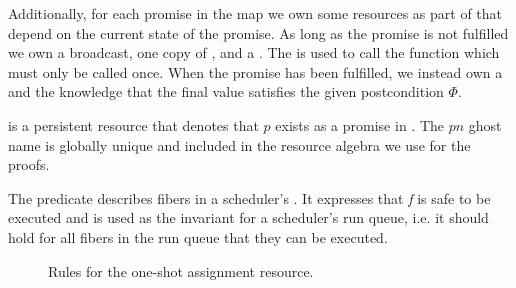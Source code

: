 Additionally, for each promise in the map we own some resources as part of \gsPInvIn{} that depend on the current state of the promise.
As long as the promise is not fulfilled we own a broadcast, one copy of \gspwait{}, and a \gssignal{}.
The \gssignal{} is used to call the  function which must only be called once.
When the promise has been fulfilled, we instead own a \gspdone{} and the knowledge that the final value satisfies the given postcondition \(Φ\).

\gsIsPr{} is a persistent resource that denotes that \(p\) exists as a promise in \gsPInvIn{}. The \(pn\) ghost name is globally unique and included in the resource algebra we use for the proofs.

The \gsReady{} predicate describes fibers in a scheduler's .
It expresses that \emph{f} is safe to be executed and is used as the invariant for a scheduler's run queue, i.e. it should hold for all fibers in the run queue that they can be executed.

\begin{figure}
  \caption{Rules for the one-shot assignment resource.}
  \label{fig:promise-state-rules}\label{spec:ps_contra}
\end{figure}

